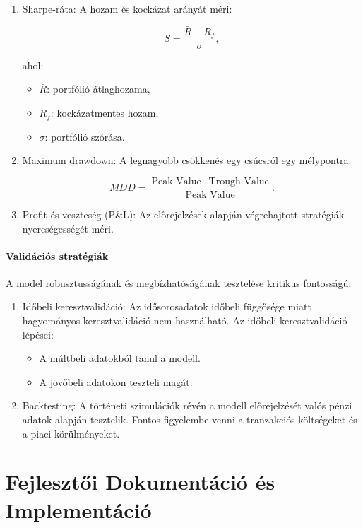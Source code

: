 \documentclass[11pt]{article}
\providecommand{\tightlist}{%
      \setlength{\itemsep}{0pt}\setlength{\parskip}{0pt}}
\begin{document}
\begin{enumerate}
\def\labelenumi{\arabic{enumi}.}
\item
  Sharpe-ráta: A hozam és kockázat arányát méri:

  \[S = \frac{\bar{R} - R_f}{\sigma},\]

  ahol:

  \begin{itemize}
  \tightlist
  \item
    \(\bar{R}\): portfólió átlaghozama,
  \item
    \(R_f\): kockázatmentes hozam,
  \item
    \(\sigma\): portfólió szórása.
  \end{itemize}
\item
  Maximum drawdown: A legnagyobb csökkenés egy csúcsról egy mélypontra:

  \[MDD = \frac{\text{Peak Value} - \text{Trough Value}}{\text{Peak Value}}.\]
\item
  Profit és veszteség (P\&L): Az előrejelzések alapján végrehajtott
  stratégiák nyereségességét méri.
\end{enumerate}

\paragraph{Validációs
stratégiák}\label{validuxe1ciuxf3s-stratuxe9giuxe1k}

A model robusztusságának és megbízhatóságának tesztelése kritikus
fontosságú:

\begin{enumerate}
\def\labelenumi{\arabic{enumi}.}
\tightlist
\item
  Időbeli keresztvalidáció: Az idősorosadatok időbeli függősége miatt
  hagyományos keresztvalidáció nem használható. Az időbeli
  keresztvalidáció lépései:

  \begin{itemize}
  \tightlist
  \item
    A múltbeli adatokból tanul a modell.
  \item
    A jövőbeli adatokon teszteli magát.
  \end{itemize}
\item
  Backtesting: A történeti szimulációk révén a modell előrejelzését
  valós pénzi adatok alapján tesztelik. Fontos figyelembe venni a
  tranzakciós költségeket és a piaci körülményeket.
\end{enumerate}

    \section{Fejlesztői Dokumentáció és
Implementáció}\label{fejlesztux151i-dokumentuxe1ciuxf3-uxe9s-implementuxe1ciuxf3}
\end{document}

